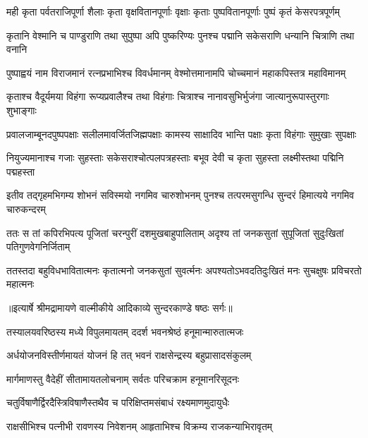 \fourlineindentedshloka
{मही कृता पर्वतराजिपूर्णा}
{ शैलाः कृता वृक्षवितानपूर्णाः}
{वृक्षाः कृताः पुष्पवितानपूर्णाः}
{ पुष्पं कृतं केसरपत्रपूर्णम्} %

\fourlineindentedshloka
{कृतानि वेश्मानि च पाण्डुराणि}
{ तथा सुपुष्पा अपि पुष्करिण्यः}
{पुनश्च पद्मानि सकेसराणि}
{ धन्यानि चित्राणि तथा वनानि} %

\fourlineindentedshloka
{पुष्पाह्वयं नाम विराजमानं}
{ रत्नप्रभाभिश्च विवर्धमानम्}
{वेश्मोत्तमानामपि चोच्चमानं}
{ महाकपिस्तत्र महाविमानम्} %

\fourlineindentedshloka
{कृताश्च वैदूर्यमया विहंगा}
{ रूप्यप्रवालैश्च तथा विहंगाः}
{चित्राश्च नानावसुभिर्भुजंगा}
{ जात्यानुरूपास्तुरगाः शुभाङ्गाः} %

\fourlineindentedshloka
{प्रवालजाम्बूनदपुष्पपक्षाः}
{ सलीलमावर्जितजिह्मपक्षाः}
{कामस्य साक्षादिव भान्ति पक्षाः}
{ कृता विहंगाः सुमुखाः सुपक्षाः} %

\fourlineindentedshloka
{नियुज्यमानाश्च गजाः सुहस्ताः}
{ सकेसराश्चोत्पलपत्रहस्ताः}
{बभूव देवी च कृता सुहस्ता}
{ लक्ष्मीस्तथा पद्मिनि पद्महस्ता} %

\fourlineindentedshloka
{इतीव तद्गृहमभिगम्य शोभनं}
{ सविस्मयो नगमिव चारुशोभनम्}
{पुनश्च तत्परमसुगन्धि सुन्दरं}
{ हिमात्यये नगमिव चारुकन्दरम्} %

\fourlineindentedshloka
{ततः स तां कपिरभिपत्य पूजितां}
{ चरन्पुरीं दशमुखबाहुपालिताम्}
{अदृश्य तां जनकसुतां सुपूजितां}
{ सुदुःखितां पतिगुणवेगनिर्जिताम्} %

\fourlineindentedshloka
{ततस्तदा बहुविधभावितात्मनः}
{ कृतात्मनो जनकसुतां सुवर्त्मनः}
{अपश्यतोऽभवदतिदुःखितं मनः}
{ सुचक्षुषः प्रविचरतो महात्मनः} %


{॥इत्यार्षे श्रीमद्रामायणे वाल्मीकीये आदिकाव्ये सुन्दरकाण्डे षष्ठः सर्गः॥}


\twolineshloka
{तस्यालयवरिष्ठस्य मध्ये विपुलमायतम्}
{ददर्श भवनश्रेष्ठं हनूमान्मारुतात्मजः} %

\twolineshloka
{अर्धयोजनविस्तीर्णमायतं योजनं हि तत्}
{भवनं राक्षसेन्द्रस्य बहुप्रासादसंकुलम्} %

\twolineshloka
{मार्गमाणस्तु वैदेहीं सीतामायतलोचनाम्}
{सर्वतः परिचक्राम हनूमानरिसूदनः} %

\twolineshloka
{चतुर्विषाणैर्द्विरदैस्त्रिविषाणैस्तथैव च}
{परिक्षिप्तमसंबाधं रक्ष्यमाणमुदायुधैः} %

\twolineshloka
{राक्षसीभिश्च पत्नीभी रावणस्य निवेशनम्}
{आहृताभिश्च विक्रम्य राजकन्याभिरावृतम्} %

